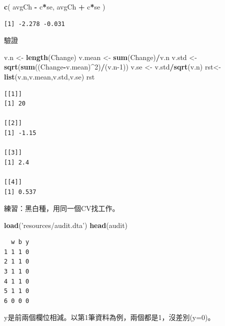 \documentclass[]{book}
\newenvironment{Shaded}{\begin{snugshade}}{\end{snugshade}}
\newcommand{\DecValTok}[1]{\textcolor[rgb]{0.00,0.00,0.81}{#1}}
\newcommand{\KeywordTok}[1]{\textcolor[rgb]{0.13,0.29,0.53}{\textbf{#1}}}
\newcommand{\NormalTok}[1]{#1}
\newcommand{\OperatorTok}[1]{\textcolor[rgb]{0.81,0.36,0.00}{\textbf{#1}}}
\newcommand{\StringTok}[1]{\textcolor[rgb]{0.31,0.60,0.02}{#1}}
\theoremstyle{definition}
\theoremstyle{definition}
\theoremstyle{definition}
\theoremstyle{remark}
\begin{document}
\begin{Shaded}
\begin{Highlighting}[]
\KeywordTok{c}\NormalTok{( avgCh }\OperatorTok{-}\StringTok{ }\NormalTok{c}\OperatorTok{*}\NormalTok{se, avgCh }\OperatorTok{+}\StringTok{ }\NormalTok{c}\OperatorTok{*}\NormalTok{se )}
\end{Highlighting}
\end{Shaded}

\begin{verbatim}
[1] -2.278 -0.031
\end{verbatim}

驗證

\begin{Shaded}
\begin{Highlighting}[]
\NormalTok{v.n <-}\StringTok{ }\KeywordTok{length}\NormalTok{(Change)}
\NormalTok{v.mean <-}\StringTok{ }\KeywordTok{sum}\NormalTok{(Change)}\OperatorTok{/}\NormalTok{v.n}
\NormalTok{v.std <-}\KeywordTok{sqrt}\NormalTok{(}\KeywordTok{sum}\NormalTok{((Change}\OperatorTok{-}\NormalTok{v.mean)}\OperatorTok{^}\DecValTok{2}\NormalTok{)}\OperatorTok{/}\NormalTok{(v.n}\DecValTok{-1}\NormalTok{))}
\NormalTok{v.se <-}\StringTok{ }\NormalTok{v.std}\OperatorTok{/}\KeywordTok{sqrt}\NormalTok{(v.n)}
\NormalTok{rst<-}\KeywordTok{list}\NormalTok{(v.n,v.mean,v.std,v.se)}
\NormalTok{rst}
\end{Highlighting}
\end{Shaded}

\begin{verbatim}
[[1]]
[1] 20

[[2]]
[1] -1.15

[[3]]
[1] 2.4

[[4]]
[1] 0.537
\end{verbatim}

練習：黑白種，用同一個CV找工作。

\begin{Shaded}
\begin{Highlighting}[]
\KeywordTok{load}\NormalTok{(}\StringTok{'resources/audit.dta'}\NormalTok{)}
\KeywordTok{head}\NormalTok{(audit)}
\end{Highlighting}
\end{Shaded}

\begin{verbatim}
  w b y
1 1 1 0
2 1 1 0
3 1 1 0
4 1 1 0
5 1 1 0
6 0 0 0
\end{verbatim}

y是前兩個欄位相減。以第1筆資料為例，兩個都是1，沒差別(y=0)。
\end{document}
